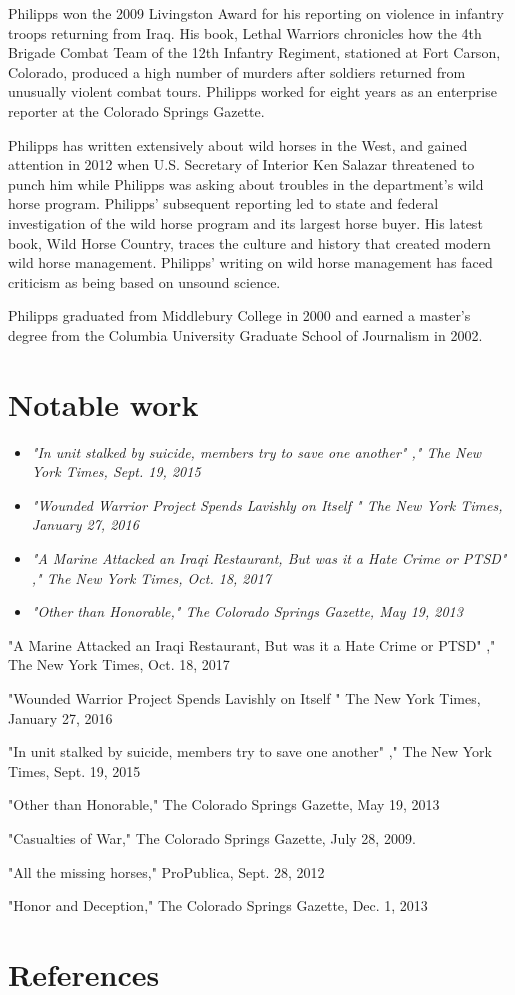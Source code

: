 Philipps won the 2009 Livingston Award for his reporting on violence in
infantry troops returning from Iraq. His book, Lethal Warriors
chronicles how the 4th Brigade Combat Team of the 12th Infantry
Regiment, stationed at Fort Carson, Colorado, produced a high number of
murders after soldiers returned from unusually violent combat tours.
Philipps worked for eight years as an enterprise reporter at the
Colorado Springs Gazette.

Philipps has written extensively about wild horses in the West, and
gained attention in 2012 when U.S. Secretary of Interior Ken Salazar
threatened to punch him while Philipps was asking about troubles in the
department's wild horse program. Philipps' subsequent reporting led to
state and federal investigation of the wild horse program and its
largest horse buyer. His latest book, Wild Horse Country, traces the
culture and history that created modern wild horse management. Philipps'
writing on wild horse management has faced criticism as being based on
unsound science.

Philipps graduated from Middlebury College in 2000 and earned a master's
degree from the Columbia University Graduate School of Journalism in
2002.

\section{Notable work}\label{notable-work}

\begin{itemize}
\item
  \emph{"In unit stalked by suicide, members try to save one another" ,"
  The New York Times, Sept. 19, 2015}
\item
  \emph{"Wounded Warrior Project Spends Lavishly on Itself " The New
  York Times, January 27, 2016}
\item
  \emph{"A Marine Attacked an Iraqi Restaurant, But was it a Hate Crime
  or PTSD" ," The New York Times, Oct. 18, 2017}
\item
  \emph{"Other than Honorable," The Colorado Springs Gazette, May 19,
  2013}
\end{itemize}

"A Marine Attacked an Iraqi Restaurant, But was it a Hate Crime or PTSD"
," The New York Times, Oct. 18, 2017

"Wounded Warrior Project Spends Lavishly on Itself " The New York Times,
January 27, 2016

"In unit stalked by suicide, members try to save one another" ," The New
York Times, Sept. 19, 2015

"Other than Honorable," The Colorado Springs Gazette, May 19, 2013

"Casualties of War," The Colorado Springs Gazette, July 28, 2009.

"All the missing horses," ProPublica, Sept. 28, 2012

"Honor and Deception," The Colorado Springs Gazette, Dec. 1, 2013

\section{References}\label{references}
